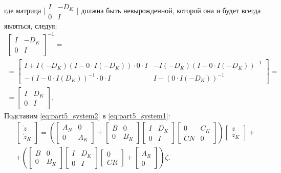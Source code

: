 где матрица $\bigl[ \begin{smallmatrix}  {I} & -{D}_K \\ 0 & {I} \end{smallmatrix} \bigr]$ должна быть невырожденной, которой она и будет всегда являться, следуя:
\begin{equation}
	\begin{gathered}
		\begin{bmatrix}
			{I} & -{D}_K \\ 0 & {I}
		\end{bmatrix}^{-1} = 
		\\
		=\begin{bmatrix}
			{I} + {I}(-{D}_K)({I}-0\cdot{I}(-{D}_K))\cdot0\cdot{I} & -{I}(-{D}_K)({I}-0\cdot{I}(-{D}_K))^{-1}\\
			-({I} - 0\cdot{I}({D}_K))^{-1}\cdot0\cdot{I} &
			{I}-(0\cdot{I}(-{D}_K))^{-1}
		\end{bmatrix}= \\
		=
		\begin{bmatrix}
			{I} & {D}_K \\ 0 & {I}
		\end{bmatrix}.
	\end{gathered}
\end{equation}
Подставим \eqref{eq:part5_system2} в \eqref{eq:part5_system1}:
\begin{align}
	\nonumber
	& \begin{bmatrix}
		{\dot{z}} \\ {\dot{z}}_K 
	\end{bmatrix}
	=\left(
	\begin{bmatrix}
		{A}_N & 0 \\
		0 & {A}_K
	\end{bmatrix}
	+
	\begin{bmatrix}
		{B} & 0 \\
		0 & {B}_K
	\end{bmatrix}
	\begin{bmatrix}
		{I} & {D}_K \\
		0 & {I}
	\end{bmatrix}
	\begin{bmatrix}
		0 & {C}_K \\
		{C}{N} & 0
	\end{bmatrix}
	\right)
	\begin{bmatrix}
		{z} \\ {z}_K
	\end{bmatrix}
	+ \\
	& + \left(
	\begin{bmatrix}
		{B} & 0 \\
		0 & {B}_K
	\end{bmatrix}
	\begin{bmatrix}
		{I} & {D}_K \\
		0 & {I}
	\end{bmatrix}
	\begin{bmatrix}
		0 \\ {C}{R}
	\end{bmatrix}
	+
	\begin{bmatrix}
		{A}_R \\ 0 
	\end{bmatrix}\right)
	{\zeta}.
\end{align}
